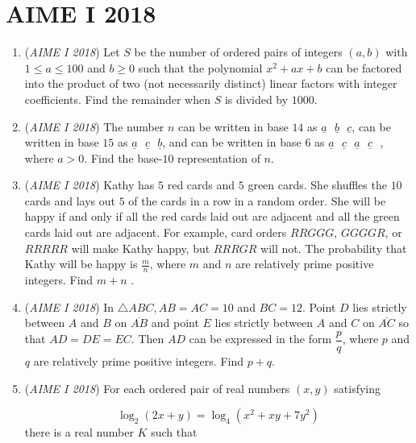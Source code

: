 \section{AIME I 2018}
        \begin{enumerate}
        	\item (\textit{AIME I 2018}) Let $S$ be the number of ordered pairs of integers $(a,b)$ with $1 \leq a \leq 100$ and $b \geq 0$ such that the polynomial $x^2+ax+b$ can be factored into the product of two (not necessarily distinct) linear factors with integer coefficients. Find the remainder when $S$ is divided by $1000$.


 

	\item (\textit{AIME I 2018}) The number $n$ can be written in base $14$ as $\underline{a}\text{ }\underline{b}\text{ }\underline{c}$, can be written in base $15$ as $\underline{a}\text{ }\underline{c}\text{ }\underline{b}$, and can be written in base $6$ as $\underline{a}\text{ }\underline{c}\text{ }\underline{a}\text{ }\underline{c}\text{ }$, where $a > 0$. Find the base-$10$ representation of $n$.


 

	\item (\textit{AIME I 2018}) Kathy has $5$ red cards and $5$ green cards. She shuffles the $10$ cards and lays out $5$ of the cards in a row in a random order. She will be happy if and only if all the red cards laid out are adjacent and all the green cards laid out are adjacent. For example, card orders $RRGGG$, $GGGGR$, or $RRRRR$ will make Kathy happy, but $RRRGR$ will not. The probability that Kathy will be happy is $\frac{m}{n}$, where $m$ and $n$ are relatively prime positive integers. Find $m + n$ .


 

	\item (\textit{AIME I 2018}) In $\triangle ABC, AB = AC = 10$ and $BC = 12$. Point $D$ lies strictly between $A$ and $B$ on $\overline{AB}$ and point $E$ lies strictly between $A$ and $C$ on $\overline{AC}$ so that $AD = DE = EC$. Then $AD$ can be expressed in the form $\dfrac{p}{q}$, where $p$ and $q$ are relatively prime positive integers. Find $p+q$.


 

	\item (\textit{AIME I 2018}) For each ordered pair of real numbers $(x,y)$ satisfying

 \[\log_2(2x+y) = \log_4(x^2+xy+7y^2)\]there is a real number $K$ such that


\end{enumerate}
